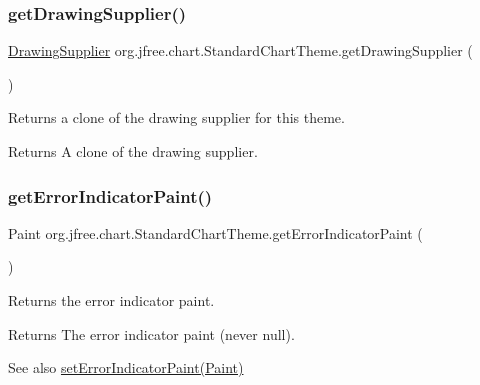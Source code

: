 \subsubsection{\texorpdfstring{get\+Drawing\+Supplier()}{getDrawingSupplier()}}
{\footnotesize\ttfamily \mbox{\hyperlink{interfaceorg_1_1jfree_1_1chart_1_1plot_1_1_drawing_supplier}{Drawing\+Supplier}} org.\+jfree.\+chart.\+Standard\+Chart\+Theme.\+get\+Drawing\+Supplier (\begin{DoxyParamCaption}{ }\end{DoxyParamCaption})}

Returns a clone of the drawing supplier for this theme.

\begin{DoxyReturn}{Returns}
A clone of the drawing supplier. 
\end{DoxyReturn}
\mbox{\label{classorg_1_1jfree_1_1chart_1_1_standard_chart_theme_a4dc50edcfef0ad19319267af81788654}} 
\subsubsection{\texorpdfstring{get\+Error\+Indicator\+Paint()}{getErrorIndicatorPaint()}}
{\footnotesize\ttfamily Paint org.\+jfree.\+chart.\+Standard\+Chart\+Theme.\+get\+Error\+Indicator\+Paint (\begin{DoxyParamCaption}{ }\end{DoxyParamCaption})}

Returns the error indicator paint.

\begin{DoxyReturn}{Returns}
The error indicator paint (never {\ttfamily null}).
\end{DoxyReturn}
\begin{DoxySeeAlso}{See also}
\mbox{\hyperlink{classorg_1_1jfree_1_1chart_1_1_standard_chart_theme_ad96237806fc1b9d3c709a0c972ae0519}{set\+Error\+Indicator\+Paint(\+Paint)}} 
\end{DoxySeeAlso}
\mbox{\label{classorg_1_1jfree_1_1chart_1_1_standard_chart_theme_acf811e55b1bbf7d66303013514a9c500}} 
